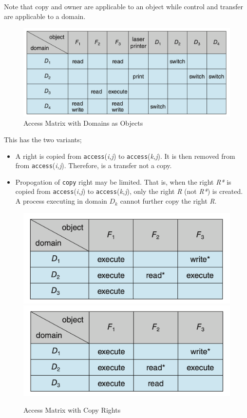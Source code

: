 \documentclass{book/custombook}
\begin{document}
                Note that copy and owner are applicable to an object while control and transfer are applicable to a domain.\\
                \begin{figure}[H]
                    \centering
                    \includegraphics[width=0.6\linewidth]{figures/access_matrix_domobj.png}
                    \caption{Access Matrix with Domains as Objects}
                \end{figure}
                This has the two variants;
                \begin{itemize}
                    \item A right is copied from \texttt{access}(\textit{i,j}) to \texttt{access}(\textit{k,j}).
                    It is then removed from from \texttt{access}(\textit{i,j}). Therefore, is a transfer not a copy.
                    \item Propogation of \texttt{copy} right may be limited. That is, when the right \textit{R*} is
                    copied from \texttt{access}(\textit{i,j}) to \texttt{access}(\textit{k,j}), only the right 
                    \textit{R} (not \textit{R*}) is created. A process executing in domain $D_k$ cannot further copy the right \textit{R}.
                \end{itemize}
                \begin{figure}[H]
                    \centering
                    \includegraphics[width=0.4\linewidth]{figures/access_matrix_copy_1.png}%
                    \includegraphics[width=0.4\linewidth]{figures/access_matrix_copy_2.png}
                    \caption{Access Matrix with Copy Rights}
                \end{figure}
\end{document}
